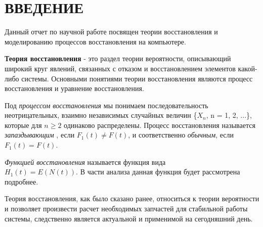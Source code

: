 
\chapter*{ВВЕДЕНИЕ}
Данный отчет по научной работе посвящен теории восстановления и моделированию процессов восстановления на компьютере.

{\bfseries Теория восстановления} - это раздел теории вероятности, описывающий широкий круг явлений, связанных с отказом и восстановлением элементов какой-либо системы. Основными понятиями теории восстановления являются процесс восстановления и уравнение восстановления.

Под  \textit { процессом восстановления} мы понимаем последовательность неотрицательных, взаимно независимых случайных величин \{$X_n$, n = 1, 2, ...\}, которые для $n\ge2$ одинаково распределены. Процесс восстановления называется \textit{ запаздывающим }, если $F_1(t) \neq F(t)$, и соответственно \textit{обычным}, если $F_1(t)=F(t)$.

\textit{Функцией восстановления} называется функция вида\\ $H_1(t)=E(N(t))$. В части анализа данная функция будет рассмотрена подробнее.

Теория восстановления, как было сказано ранее, относиться к теории вероятности и позволяет произвести расчет необходимых запчастей для стабильной работы системы, следственно является актуальной и применимой на сегодняшний день.
\newpage
